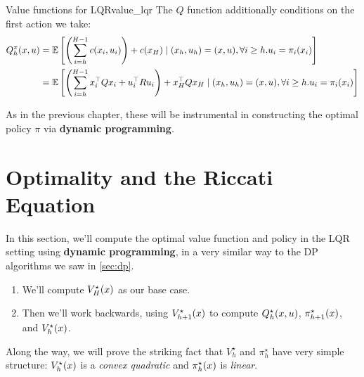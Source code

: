 \documentclass[../main/main]{subfiles}
\begin{document}
\begin{definition}{Value functions for LQR}{value_lqr}
    The $Q$ function additionally conditions on the first
    action we take:
    \[
        \begin{split}
            Q^\pi_h (x, u) &= \operatorname*{\mathbb{E}} \left[ \left( \sum_{i=h}^{H-1} c(x_i, u_i) \right) + c(x_H) \mid  (x_h, u_h) = (x, u), \forall i \ge h. u_i = \pi_i(x_i) \right] \\
            &= \operatorname*{\mathbb{E}} \left[ \left( \sum_{i=h}^{H-1} x_i^\top Q x_i + u_i^\top R u_i \right) + x_H^\top Q x_H \mid (x_h, u_h) = (x, u), \forall i \ge h. u_i = \pi_i(x_i) \right] \\
        \end{split}
    \]
\end{definition}

As in the previous chapter, these will be instrumental in constructing the optimal policy $\pi$ via \textbf{dynamic programming}.

\section{Optimality and the Riccati Equation} \label{sec:optimal_lqr}

In this section, we'll compute the optimal value function and policy in the LQR setting using \textbf{dynamic programming}, in a very similar way to the DP algorithms we saw in \autoref{sec:dp}. %
\begin{enumerate}
    \item We'll compute $V_H^\star(x)$ as our base case.
    \item Then we'll work backwards, using $V_{h+1}^\star(x)$ to compute $Q_h^\star(x, u)$, $\pi_{h+1}^\star(x)$, and $V_h^\star(x)$.
\end{enumerate}
Along the way, we will prove the striking fact that $V_h^\star$ and $\pi_h^\star$ have very simple structure: $V_h^\star(x)$ is a \emph{convex quadratic} and $\pi_h^\star(x)$ is \emph{linear}.
\end{document}
